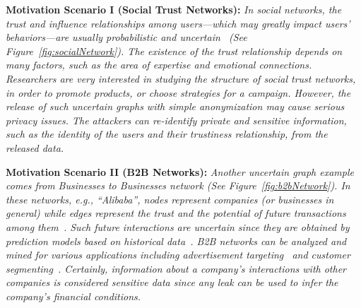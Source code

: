 {\textbf{Motivation Scenario I (Social Trust Networks): }}
{\em 
In social networks, the trust and influence relationships among users---which may greatly impact users' behaviors---are usually probabilistic and uncertain~\cite{Kempe_Maximizing_2003} 
(See Figure~\ref{fig:socialNetwork}). The existence of the trust relationship depends on many factors, such as the area of expertise and emotional connections.
Researchers are very interested in studying the structure of social trust networks, in order to  promote products, or choose strategies for a campaign. 
However, the release of such uncertain graphs with simple anonymization may cause serious privacy issues.
The attackers can  re-identify private and sensitive information, such as the identity of the users and their trustiness relationship, from the released data.
}

\vspace{2mm}
{\textbf{Motivation Scenario II (B2B Networks): }}
{\em  Another uncertain graph example comes from Businesses to Businesses network (See Figure~\ref{fig:b2bNetwork}). In these networks, e.g., ``Alibaba'', nodes represent companies (or businesses in general) 
while edges represent the trust and the potential of future transactions among them~\cite{Lin_B2B}. Such future interactions are uncertain since they are obtained by prediction models 
based on historical data~\cite{Liben_Nowell_Kleinberg_2007}. B2B networks can be analyzed and mined for various applications including 
advertisement targeting~\cite{Abrahams20132777} and customer segmenting~\cite{alsina2015targeting}. 
Certainly, information about a company's interactions with other companies is considered sensitive data since any leak can be used to infer the company's financial conditions.
}
 

